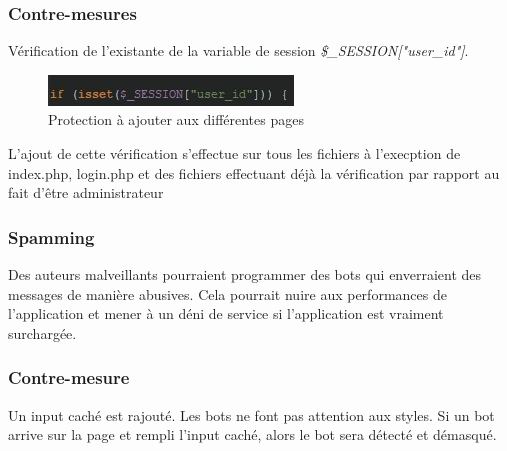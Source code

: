 \documentclass[12pt]{article}
\begin{document}
\subsubsection{Contre-mesures}
Vérification de l'existante de la variable de session \textit{\$\_SESSION["user\_id"]}.
\begin{figure}[H]
\centering
\includegraphics[width=\linewidth]{images/protectionPage.jpg}
\caption{Protection à ajouter aux différentes pages}
\end{figure}
L'ajout de cette vérification s'effectue sur tous les fichiers à l'execption de index.php, login.php et des fichiers effectuant déjà la vérification par rapport au fait d'être administrateur

\subsubsection{Spamming}
Des auteurs malveillants pourraient programmer des bots qui enverraient des messages de manière abusives. Cela pourrait nuire aux performances de l'application et mener à un déni de service si l'application est vraiment surchargée.

\subsubsection{Contre-mesure}
Un input caché est rajouté. Les bots ne font pas attention aux styles. Si un bot arrive sur la page et rempli l'input caché, alors le bot sera détecté et démasqué.
\end{document}
